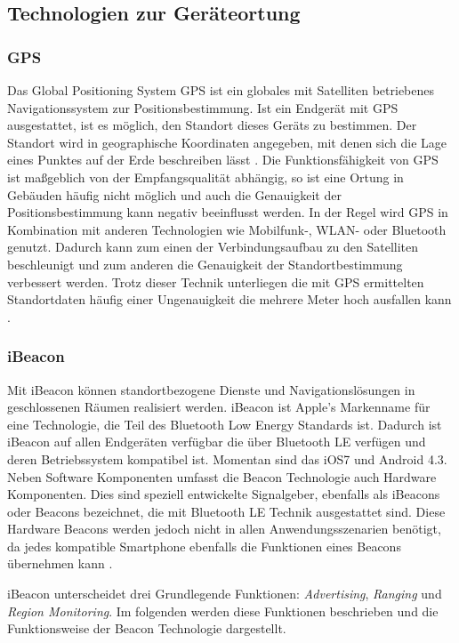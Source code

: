 \subsection{Technologien zur Geräteortung}

\subsubsection{GPS}
\label{subsec:GPS}
Das Global Positioning System \ac{GPS} ist ein globales mit Satelliten betriebenes Navigationssystem zur Positionsbestimmung. Ist ein Endgerät mit \ac{GPS} ausgestattet, ist es möglich, den Standort dieses Geräts zu bestimmen. Der Standort wird in geographische Koordinaten angegeben, mit denen sich die Lage eines Punktes auf der Erde beschreiben lässt \cite{wiki:GPS}. Die Funktionsfähigkeit von \ac{GPS} ist maßgeblich von der Empfangsqualität abhängig, so ist eine Ortung in Gebäuden häufig nicht möglich und auch die Genauigkeit der Positionsbestimmung kann negativ beeinflusst werden. In der Regel wird \ac{GPS} in Kombination mit anderen Technologien wie Mobilfunk-, \ac{WLAN}- oder Bluetooth genutzt. Dadurch kann zum einen der Verbindungsaufbau zu den Satelliten beschleunigt und zum anderen die Genauigkeit der Standortbestimmung verbessert werden. Trotz dieser Technik unterliegen die mit \ac{GPS} ermittelten Standortdaten häufig einer Ungenauigkeit die mehrere Meter hoch ausfallen kann \cite{AppleLocationServices:Online}.

\subsubsection{iBeacon}
\label{subsec:beacons}
Mit iBeacon können standortbezogene Dienste und Navigationslösungen in geschlossenen Räumen realisiert werden. iBeacon ist Apple's Markenname für eine Technologie, die Teil des Bluetooth Low Energy Standards ist. Dadurch ist iBeacon auf allen Endgeräten verfügbar die über Bluetooth LE verfügen und deren Betriebssystem kompatibel ist. Momentan sind das \acs{iOS}7 und Android 4.3. Neben Software Komponenten umfasst die Beacon Technologie auch Hardware Komponenten. Dies sind speziell entwickelte Signalgeber, ebenfalls als iBeacons oder Beacons bezeichnet, die mit Bluetooth LE Technik ausgestattet sind. Diese Hardware Beacons werden jedoch nicht in allen Anwendungsszenarien benötigt, da jedes kompatible Smartphone ebenfalls die Funktionen eines Beacons übernehmen kann \cite{wiki:iBeacon}.

iBeacon unterscheidet drei Grundlegende Funktionen: \textit{Advertising}, \textit{Ranging} und \textit{Region Monitoring}. Im folgenden werden diese Funktionen beschrieben und die Funktionsweise der Beacon Technologie dargestellt.

